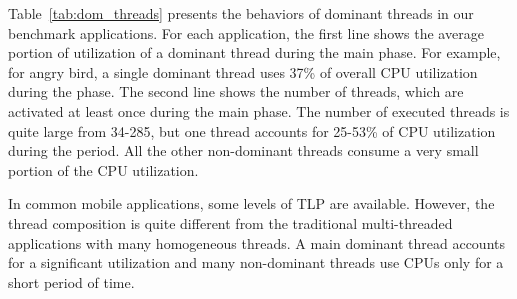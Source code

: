 Table~\ref{tab:dom_threads} presents the behaviors of dominant threads in our benchmark applications.
For each application, the first line shows the average portion of utilization of a dominant thread during
the main phase. For example, for angry bird, a single dominant thread uses 37\% of overall CPU utilization 
during the phase. The second line shows the number of threads, which are activated at least once 
during the main phase. The number of
executed threads is quite large from 34-285, but one thread accounts for 25-53\% of CPU utilization during
the period. All the other non-dominant threads consume a very small portion of the CPU utilization.

In common mobile applications, some levels of TLP are available. However, the thread composition is
quite different from the traditional multi-threaded applications with many homogeneous threads.
A main dominant thread accounts for a significant utilization and many non-dominant threads use
CPUs only for a short period of time. 

\begin{comment}
\begin{figure}[bt]
\begin{center}
\epsfig{figure=graphs/angry_thread.eps, width=8cm}
\epsfig{figure=graphs/browser_thread.eps, width=8cm}
\end{center}
\caption{Application threads with 2 cores}
\label{fig:threads}
\end{figure}
\end{comment}

\begin{comment}
Figure~\ref{fig:threads} presents the CPU utilization of active threads with 2 core runs.
For both applications, the top thread dominates core utilization. For the game application,
there is only a small amount of utilization by the rest of threads, causing unbalanced loads
in two cores. For the browser application, there are several other active threads, which
can share the second core.
\end{comment}
